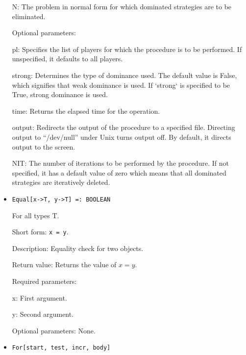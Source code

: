 \begin{itemize}
\bd
\item
[N:] The problem in normal form for which dominated strategies are to
be eliminated.
\ed

\item
[Optional parameters:]\hfil\null

\bd
\item
[pl:] Specifies the list of players for which the procedure is to be
performed.  If unspecified, it defaults to all players.
\item
[strong:] Determines the type of dominance used.  The default value is
False, which signifies that weak dominance is used.  If `strong` is
specified to be True, strong dominance is used.
\item
[time:] Returns the elapsed time for the operation.
\item
[output:] Redirects the output of the procedure to a specified file.
Directing output to ``/dev/null'' under Unix turns output off.  By
default, it directs output to the screen.
\item
[NIT:] The number of iterations to be performed by the procedure.  If
not specified, it has a default value of zero which means that all
dominated strategies are iteratively deleted.
\ed
\ed

\item
\protect \large \begin{verbatim}
Equal[x->T, y->T] =: BOOLEAN
\end{verbatim}\normalsize

For all types T.

\bd
\item
[Short form:] \verb+x = y+.
\item
[Description:] Equality check for two objects.
\item
[Return value:] Returns the value of $x = y$.
\item
[Required parameters:]\hfil\null
	
\bd
\item
[x:] First argument.
\item
[y:] Second argument.
\ed

\item
[Optional parameters:] None.

\ed


\item
\protect \large \begin{verbatim}
For[start, test, incr, body]
\end{verbatim}\normalsize


\end{itemize}
